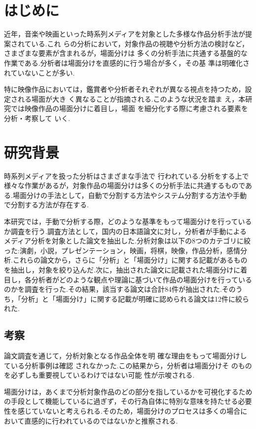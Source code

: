 \def\sectionmargin{\vspace{12pt}}

\section{はじめに}
近年，音楽や映画といった時系列メディアを対象とした多様な作品分析手法が提案されている.これ
らの分析において，対象作品の視聴や分析方法の検討など，さまざまな要素が含まれるが，場面分けは
多くの分析手法に共通する基盤的な作業である.分析者は場面分けを直感的に行う場合が多く，その基
準は明確化されていないことが多い.

特に映像作品においては，鑑賞者や分析者それぞれが異なる視点を持つため，設定される場面が大き
く異なることが指摘される.このような状況を踏ま
え，本研究では映像作品の場面分けに着目し，場面
を細分化する際に考慮される要素を分析・考察して
いく.
\sectionmargin
\section{研究背景}
時系列メディアを扱った分析はさまざまな手法で
行われている.分析をする上で様々な作業があるが，対象作品の場面分けは多くの分析手法に共通するものである.場面分けの手法として，自動で分割する方法やシステム分割する方法や手動で分割する方法が存在する.

本研究では，手動で分析する際，どのような基準をもって場面分けを行っているか調査を行う.調査方法として，国内の日本語論文に対し，分析者が手動によるメディア分析を対象とした論文を抽出した.分析対象は以下の8つのカテゴリに絞った:演劇，小説，プレゼンテーション，映画，将棋，映像，作品分析，感情分析.これらの論文から，さらに「分析」と「場面分け」に関する記載があるものを抽出し，対象を絞り込んだ.次に，抽出された論文に記載された場面分けに着目し，各分析者がどのような観点や理論に基づいて作品の場面分けを行っているのかを調査を行った.その結果，該当する論文は合計84件が抽出された.そのうち，「分析」と「場面分け」に関する記載が明確に認められる論文は12件に絞られた.
\sectionmargin
\subsection{考察}
論文調査を通じて，分析対象となる作品全体を明
確な理由をもって場面分けしている分析事例は確認
されなかった.この結果から，分析者は場面分けそ
のものを必ずしも重要視しているわけではない可能
性が示唆される.

場面分けは，あくまで分析対象作品のどの部分を指しているかを可視化するための手段として機能しているに過ぎず，その行為自体に特別な意味を持たせる必要性を感じていないと考えられる.そのため，場面分けのプロセスは多くの場合において直感的に行われているのではないかと推察される.
\sectionmargin
